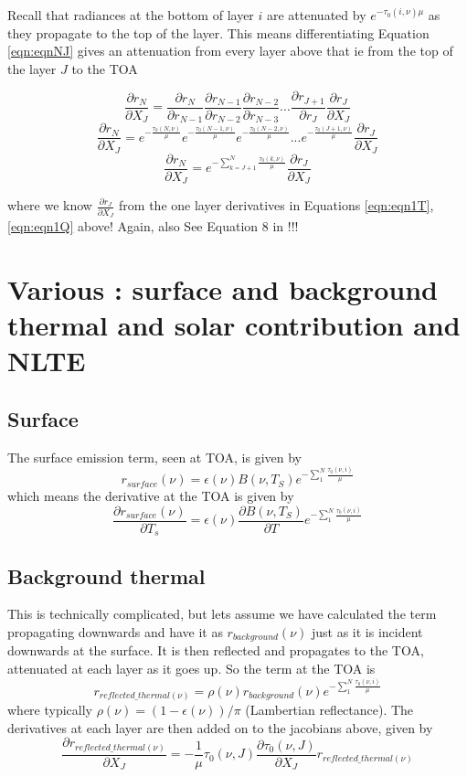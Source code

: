 \documentclass[11pt]{article}
\begin{document}
Recall that radiances at the bottom of layer $i$ are attenuated by
$e^{-{\tau_{0}(i,\nu)}{\mu}}$ as they propagate to the top of the
layer. This means differentiating Equation \ref{eqn:eqnNJ} gives an
attenuation from every layer above that ie from the top of the layer $J$ to the TOA

\begin{equation}
\frac{\partial r_{N}}{\partial X_{J}} = \frac{\partial r_{N}}{\partial r_{N-1}}  \frac{\partial r_{N-1}}{\partial r_{N-2}} \frac{\partial r_{N-2}}{\partial r_{N-3}} ... \frac{\partial r_{J+1}}{\partial r_{J}} \frac{\partial r_{J}}{\partial X_{J}}
\end{equation}
\begin{equation}
\frac{\partial r_{N}}{\partial X_{J}} = e^{-\frac{\tau_{0}(N,\nu)}{\mu}} e^{-\frac{\tau_{0}(N-1,\nu)}{\mu}} e^{-\frac{\tau_{0}(N-2,\nu)}{\mu}} ... e^{-\frac{\tau_{0}(J+1,\nu)}{\mu}} \frac{\partial r_{J}}{\partial X_{J}}
\end{equation}
\begin{equation}
\frac{\partial r_{N}}{\partial X_{J}} = e^{-\sum_{k=J+1}^N \frac{\tau_{0}(k,\nu)}{\mu}} \frac{\partial r_{J}}{\partial X_{J}}
\end{equation}

where we know $\frac{\partial r_{J}}{\partial X_{J}}$ from the one layer derivatives in Equations \ref{eqn:eqn1T},\ref{eqn:eqn1Q} above! Again, also See Equation 8 in \citep{liu:06}!!!

\section{Various : surface and background thermal and solar contribution and NLTE}

\subsection{Surface}
The surface emission term, seen at TOA, is given by
\[
r_{surface}(\nu) = \epsilon(\nu) B(\nu,T_S) e^{-\sum_1^N \frac{\tau_0(\nu,i)}{\mu}}
\]
which means the derivative at the TOA is given by 
\[
\frac{\partial r_{surface}(\nu)}{\partial T_s} = \epsilon(\nu) \frac{\partial B(\nu,T_S)}{\partial T} e^{-\sum_1^N \frac{\tau_0(\nu,i)}{\mu}}
\]

\subsection{Background thermal}
This is technically complicated, but lets assume we have calculated
the term propagating downwards and have it as $r_{background}(\nu)$
just as it is incident downwards at the surface. It is then reflected
and propagates to the TOA, attenuated at each layer as it goes up. So
the term at the TOA is 
\[
r_{reflected\_thermal(\nu)} = \rho(\nu) r_{background}(\nu) e^{-\sum_1^N \frac{\tau_0(\nu,i)}{\mu}}
\]
where typically $\rho(\nu) = (1-\epsilon(\nu))/\pi$ (Lambertian
reflectance). The derivatives at each layer are then added on to the jacobians above, given by
\[
\frac{\partial r_{reflected\_thermal(\nu)}}{\partial X_J} = -\frac{1}{\mu} \tau_0(\nu,J) \frac{\partial \tau_0(\nu,J)}{\partial X_J}r_{reflected\_thermal(\nu)}
\]
\end{document}
